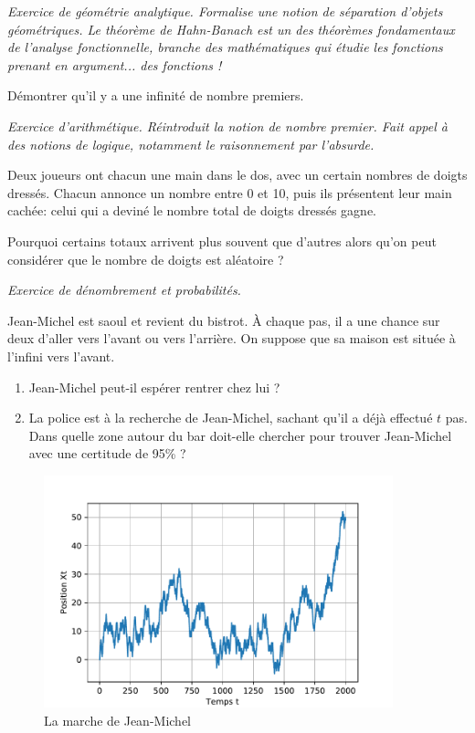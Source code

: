 \documentclass[12pt]{article}
\theoremstyle{definition}
\begin{document}
\textit{Exercice de géométrie analytique. Formalise une notion de séparation d'objets géométriques. Le théorème de Hahn-Banach est un des théorèmes fondamentaux de l'analyse fonctionnelle, branche des mathématiques qui étudie les fonctions prenant en argument... des fonctions !}

\begin{exer}
	Démontrer qu'il y a une infinité de nombre premiers.
\end{exer}

\textit{Exercice d'arithmétique. Réintroduit la notion de nombre premier. Fait appel à des notions de logique, notamment le raisonnement par l'absurde.}


\begin{exer}[La mourre]
	Deux joueurs ont chacun une main dans le dos, avec un certain nombres de doigts dressés. Chacun annonce un nombre entre 0 et 10, puis ils présentent leur main cachée: celui qui a deviné le nombre total de doigts dressés gagne.
	
	Pourquoi certains totaux arrivent plus souvent que d'autres alors qu'on peut considérer que le nombre de doigts est aléatoire ?
\end{exer}

\textit{Exercice de dénombrement et probabilités.}

\begin{exer}
Jean-Michel est saoul et revient du bistrot. À chaque pas, il a une chance sur deux d'aller vers l'avant ou vers l'arrière. On suppose que sa maison est située à l'infini vers l'avant.
\begin{enumerate}
	\item Jean-Michel peut-il espérer rentrer chez lui ?
	\item La police est à la recherche de Jean-Michel, sachant qu'il a déjà effectué $t$ pas. Dans quelle zone autour du bar doit-elle chercher pour trouver Jean-Michel avec une certitude de 95\% ?
\end{enumerate}	

\end{exer}

\begin{figure}[!ht]
	\includegraphics[width=0.9\textwidth]{../images/marcheJM.pdf}
	\caption{La marche de Jean-Michel}
\end{figure}
\end{document}
